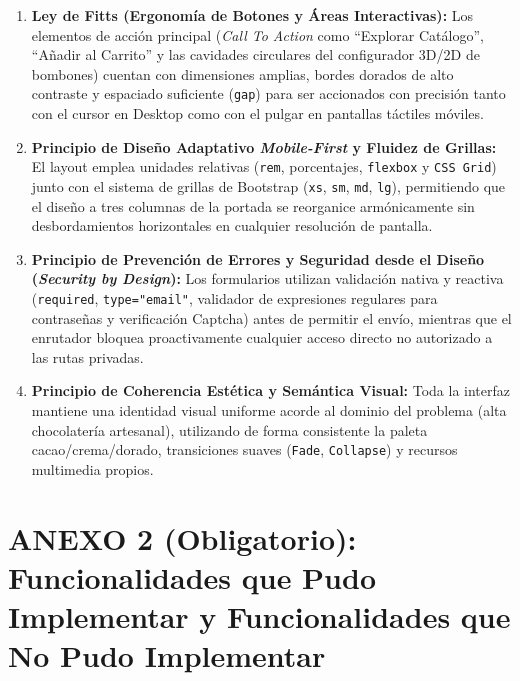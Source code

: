 \documentclass[12pt,letterpaper]{article}
\begin{document}
\begin{enumerate}[leftmargin=1.2cm]
  \item \textbf{Ley de Fitts (Ergonomía de Botones y Áreas Interactivas):}
    Los elementos de acción principal (\textit{Call To Action} como ``Explorar Catálogo'', ``Añadir al Carrito'' y las cavidades circulares del configurador 3D/2D de bombones) cuentan con dimensiones amplias, bordes dorados de alto contraste y espaciado suficiente (\texttt{gap}) para ser accionados con precisión tanto con el cursor en Desktop como con el pulgar en pantallas táctiles móviles.

  \item \textbf{Principio de Diseño Adaptativo \textit{Mobile-First} y Fluidez de Grillas:}
    El layout emplea unidades relativas (\texttt{rem}, porcentajes, \texttt{flexbox} y \texttt{CSS Grid}) junto con el sistema de grillas de Bootstrap (\texttt{xs}, \texttt{sm}, \texttt{md}, \texttt{lg}), permitiendo que el diseño a tres columnas de la portada se reorganice armónicamente sin desbordamientos horizontales en cualquier resolución de pantalla.

  \item \textbf{Principio de Prevención de Errores y Seguridad desde el Diseño (\textit{Security by Design}):}
    Los formularios utilizan validación nativa y reactiva (\texttt{required}, \texttt{type="email"}, validador de expresiones regulares para contraseñas y verificación Captcha) antes de permitir el envío, mientras que el enrutador bloquea proactivamente cualquier acceso directo no autorizado a las rutas privadas.

  \item \textbf{Principio de Coherencia Estética y Semántica Visual:}
    Toda la interfaz mantiene una identidad visual uniforme acorde al dominio del problema (alta chocolatería artesanal), utilizando de forma consistente la paleta cacao/crema/dorado, transiciones suaves (\texttt{Fade}, \texttt{Collapse}) y recursos multimedia propios.
\end{enumerate}

\newpage

\section*{ANEXO 2 (Obligatorio): Funcionalidades que Pudo Implementar y Funcionalidades que No Pudo Implementar}
\end{document}
